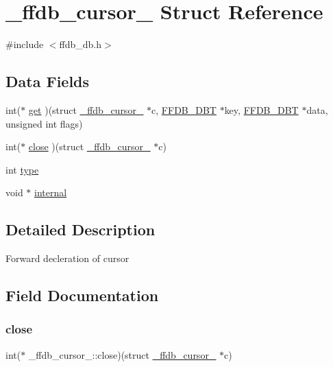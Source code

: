 \hypertarget{struct__ffdb__cursor__}{}\section{\+\_\+ffdb\+\_\+cursor\+\_\+ Struct Reference}
\label{struct__ffdb__cursor__}


{\ttfamily \#include $<$ffdb\+\_\+db.\+h$>$}

\subsection*{Data Fields}
\begin{DoxyCompactItemize}
\item 
int($\ast$ \mbox{\hyperlink{struct__ffdb__cursor___a775458eba1f9b1d69b9b394faaf31ae2}{get}} )(struct \mbox{\hyperlink{struct__ffdb__cursor__}{\+\_\+ffdb\+\_\+cursor\+\_\+}} $\ast$c, \mbox{\hyperlink{adat-devel_2other__libs_2filedb_2filehash_2ffdb__db_8h_aa2e0984399491df0fdd20898ca8758f9}{F\+F\+D\+B\+\_\+\+D\+BT}} $\ast$key, \mbox{\hyperlink{adat-devel_2other__libs_2filedb_2filehash_2ffdb__db_8h_aa2e0984399491df0fdd20898ca8758f9}{F\+F\+D\+B\+\_\+\+D\+BT}} $\ast$data, unsigned int flags)
\item 
int($\ast$ \mbox{\hyperlink{struct__ffdb__cursor___a68eb849c2cd709a772c6168920d98c66}{close}} )(struct \mbox{\hyperlink{struct__ffdb__cursor__}{\+\_\+ffdb\+\_\+cursor\+\_\+}} $\ast$c)
\item 
int \mbox{\hyperlink{struct__ffdb__cursor___a19f215e12f2d09687f089c87c7b00f29}{type}}
\item 
void $\ast$ \mbox{\hyperlink{struct__ffdb__cursor___a1c07d3b46c0463000411b3a8819f928e}{internal}}
\end{DoxyCompactItemize}


\subsection{Detailed Description}
Forward decleration of cursor 

\subsection{Field Documentation}
\mbox{\label{struct__ffdb__cursor___a68eb849c2cd709a772c6168920d98c66}} 
\subsubsection{\texorpdfstring{close}{close}}
{\footnotesize\ttfamily int($\ast$ \+\_\+ffdb\+\_\+cursor\+\_\+\+::close)(struct \mbox{\hyperlink{struct__ffdb__cursor__}{\+\_\+ffdb\+\_\+cursor\+\_\+}} $\ast$c)}

